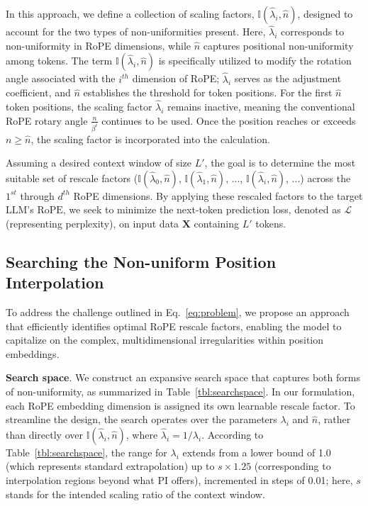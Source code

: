In this approach, we define a collection of scaling factors, $\mathbb{I}(\hat{\lambda}_{i},\hat{n})$, designed to account for the two types of non-uniformities present. Here, $\hat{\lambda}_i$ corresponds to non-uniformity in RoPE dimensions, while $\hat{n}$ captures positional non-uniformity among tokens. The term $\mathbb{I}(\hat{\lambda}_{i},\hat{n})$ is specifically utilized to modify the rotation angle associated with the $i^{th}$ dimension of RoPE; $\hat\lambda_i$ serves as the adjustment coefficient, and $\hat{n}$ establishes the threshold for token positions. For the first $\hat{n}$ token positions, the scaling factor $\hat\lambda_i$ remains inactive, meaning the conventional RoPE rotary angle $\frac{n}{\beta^i}$ continues to be used. Once the position reaches or exceeds $n\ge\hat{n}$, the scaling factor is incorporated into the calculation.

Assuming a desired context window of size $L'$, the goal is to determine the most suitable set of rescale factors ($\mathbb{I}(\hat{\lambda}_{0},\hat{n})$, $\mathbb{I}(\hat{\lambda}_{1},\hat{n})$, ..., $\mathbb{I}(\hat{\lambda}_{i},\hat{n})$, ...) across the $1^{st}$ through $d^{th}$ RoPE dimensions. By applying these rescaled factors to the target $\text{LLM}$'s $\text{RoPE}$, we seek to minimize the next-token prediction loss, denoted as $\mathcal{L}$ (representing perplexity), on input data $\mathbf{X}$ containing $L'$ tokens.

\subsection{Searching the Non-uniform Position Interpolation}

To address the challenge outlined in Eq.~\ref{eq:problem}, we propose an approach that efficiently identifies optimal RoPE rescale factors, enabling the model to capitalize on the complex, multidimensional irregularities within position embeddings.

\textbf{Search space}. We construct an expansive search space that captures both forms of non-uniformity, as summarized in Table~\ref{tbl:searchspace}. In our formulation, each RoPE embedding dimension is assigned its own learnable rescale factor. To streamline the design, the search operates over the parameters $\lambda_i$ and $\hat{n}$, rather than directly over $\mathbb{I}(\hat{\lambda}_{i},\hat{n})$, where $\hat{\lambda}_{i}=1/\lambda_i$. According to Table~\ref{tbl:searchspace}, the range for $\lambda_i$ extends from a lower bound of 1.0 (which represents standard extrapolation) up to $s\times1.25$ (corresponding to interpolation regions beyond what PI offers), incremented in steps of 0.01; here, $s$ stands for the intended scaling ratio of the context window.

